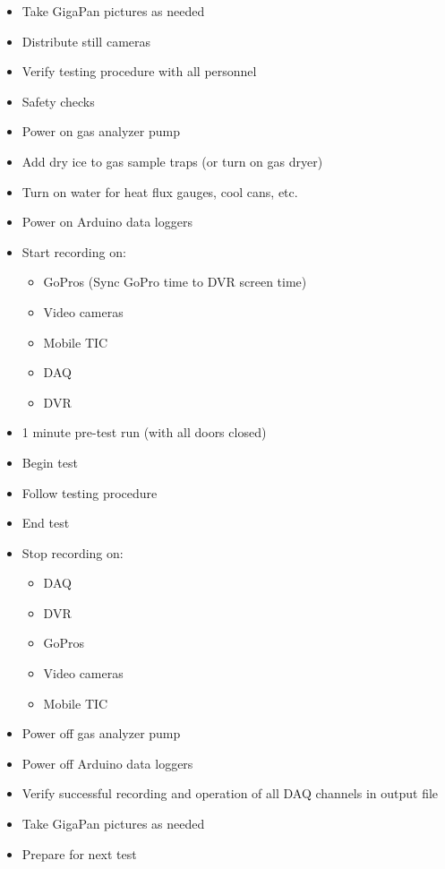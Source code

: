 \documentclass[11pt,oneside]{book}
\begin{document}
\begin{itemize}
\item Take GigaPan pictures as needed
\item Distribute still cameras

\item Verify testing procedure with all personnel
\item Safety checks

\item Power on gas analyzer pump
\item Add dry ice to gas sample traps (or turn on gas dryer)

\item Turn on water for heat flux gauges, cool cans, etc.

\item Power on Arduino data loggers

\item Start recording on:
    \begin{itemize}
    \item GoPros (Sync GoPro time to DVR screen time)
    \item Video cameras
    \item Mobile TIC
    \item DAQ
    \item DVR
    \end{itemize}

\item 1 minute pre-test run (with all doors closed)

\item Begin test

\item Follow testing procedure

\item End test

\item Stop recording on:
    \begin{itemize}
    \item DAQ
    \item DVR
    \item GoPros
    \item Video cameras
    \item Mobile TIC
    \end{itemize}

\item Power off gas analyzer pump

\item Power off Arduino data loggers

\item Verify successful recording and operation of all DAQ channels in output file

\item Take GigaPan pictures as needed

\item Prepare for next test
\end{itemize}
\end{document}
